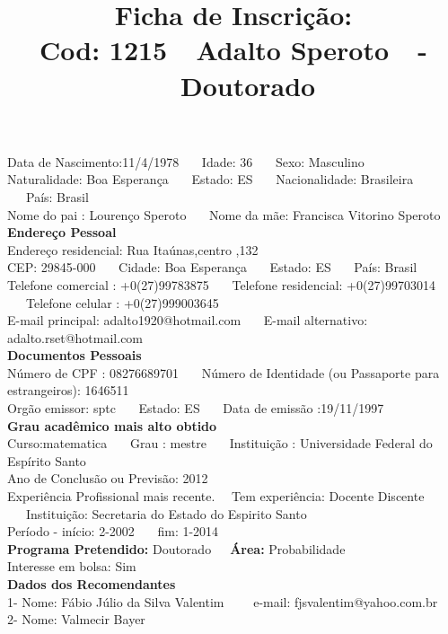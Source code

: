 \documentclass[11pt]{article}
\title{\vspace*{-4cm} Ficha de Inscrição: \\Cod: 1215\ \ Adalto Speroto\ \ - \ \ Doutorado 
 }
\date{}
\begin{document}
\maketitle
\vspace*{-1.5cm}
\noindent Data de Nascimento:11/4/1978
\ \ \ Idade: 36   \ \ \ Sexo: Masculino
\\
Naturalidade: Boa Esperança  
\ \ \  Estado: ES
\ \ \  Nacionalidade: Brasileira
\ \ \ País: Brasil
\\        
Nome do pai : Lourenço Speroto
\ \ \ Nome da mãe: Francisca Vitorino Speroto          
\\[0.2cm]                     
\textbf{Endereço Pessoal} 
\\ 
\noindent Endereço residencial: Rua Itaúnas,centro ,132
\\
        CEP: 29845-000 
\ \ \ Cidade: Boa Esperança 
\ \ \ Estado: ES 
\ \ \ País: Brasil
\\		
		Telefone comercial : +0(27)99783875
\ \ \ Telefone residencial: +0(27)99703014
\ \ \ Telefone celular : +0(27)999003645
\\
E-mail principal: adalto1920@hotmail.com
\ \ \ E-mail alternativo: adalto.rset@hotmail.com 
\\[0.2cm] 
\textbf{Documentos Pessoais}
\\
\noindent Número de CPF : 08276689701
\ \ \ Número de Identidade (ou Passaporte para estrangeiros): 1646511
\\
Orgão emissor: sptc
\ \ \ Estado: ES
\ \ \ Data de emissão :19/11/1997
\\[0.3cm]
\textbf{Grau acadêmico mais alto obtido}
\\	
Curso:matematica
\ \ \ Grau : mestre
\ \ \ Instituição : Universidade Federal do Espírito Santo
\\			
Ano de Conclusão ou Previsão: 2012
\\ 
Experiência Profissional mais recente. \ \  
Tem experiência: Docente Discente  
\ \ \ Instituição: Secretaria do Estado do Espirito Santo
\\  
Período - início: 2-2002
\ \ \ fim: 1-2014
\\[0.2cm] 
\textbf{Programa Pretendido:} Doutorado\ \ \ \textbf{Área:} Probabilidade\\
Interesse em bolsa: Sim
\\[0.3cm]		
\textbf{Dados dos Recomendantes} 
\\
1- Nome: Fábio Júlio da Silva Valentim
\ \ \ \  e-mail: fjsvalentim@yahoo.com.br 
\\
2- Nome: Valmecir Bayer
\end{document}
